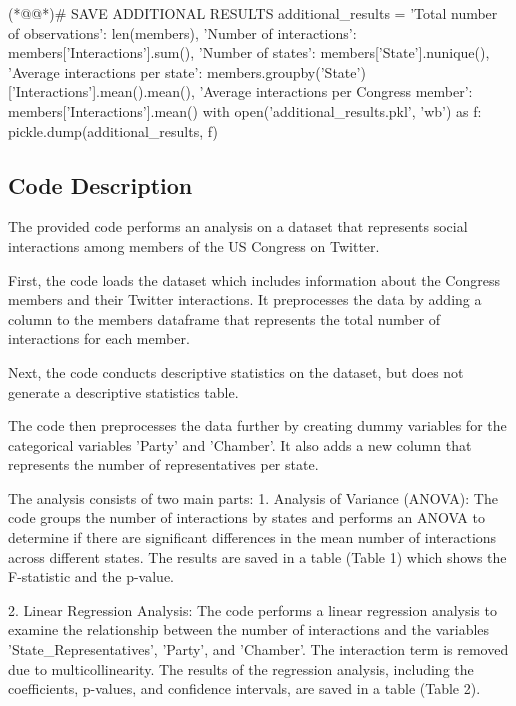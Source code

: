 \documentclass[11pt]{article}
\begin{document}
\begin{python}
(*@@*)# SAVE ADDITIONAL RESULTS
additional_results = {
    'Total number of observations': len(members), 
    'Number of interactions': members['Interactions'].sum(),
    'Number of states': members['State'].nunique(),
    'Average interactions per state': members.groupby('State')['Interactions'].mean().mean(),
    'Average interactions per Congress member': members['Interactions'].mean()
}
with open('additional_results.pkl', 'wb') as f:
    pickle.dump(additional_results, f)

\end{python}

\subsection{Code Description}

The provided code performs an analysis on a dataset that represents social interactions among members of the US Congress on Twitter. 

First, the code loads the dataset which includes information about the Congress members and their Twitter interactions. It preprocesses the data by adding a column to the members dataframe that represents the total number of interactions for each member.

Next, the code conducts descriptive statistics on the dataset, but does not generate a descriptive statistics table.

The code then preprocesses the data further by creating dummy variables for the categorical variables 'Party' and 'Chamber'. It also adds a new column that represents the number of representatives per state.

The analysis consists of two main parts:
1. Analysis of Variance (ANOVA): The code groups the number of interactions by states and performs an ANOVA to determine if there are significant differences in the mean number of interactions across different states. The results are saved in a table (Table 1) which shows the F-statistic and the p-value.

2. Linear Regression Analysis: The code performs a linear regression analysis to examine the relationship between the number of interactions and the variables 'State\_Representatives', 'Party', and 'Chamber'. The interaction term is removed due to multicollinearity. The results of the regression analysis, including the coefficients, p-values, and confidence intervals, are saved in a table (Table 2).
\end{document}
